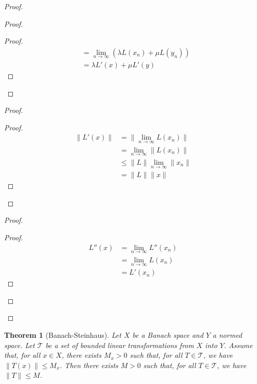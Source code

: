 \documentclass{book}
\let\qed\relax
\newtheorem{thm}[ax]{Theorem}
\theoremstyle{definition}
\begin{document}
\begin{proof}
\begin{proof}
\begin{proof}
\begin{align*}
			& = \lim_{n \rightarrow \infty} (\lambda L(x_n) + \mu L(y_n)) \\
			& = \lambda L'(x) + \mu L'(y)
		\end{align*}
	\end{proof}
\end{proof}
\begin{proof}
	\begin{proof}
		\pf
		\begin{align*}
			\| L'(x) \| & = \| \lim_{n \rightarrow \infty} L(x_n) \| \\
			& = \lim_{n \rightarrow \infty} \| L(x_n) \| \\
			& \leq \|L\| \lim_{n \rightarrow \infty} \| x_n \| \\
			& = \| L \| \| x \|
		\end{align*}
	\end{proof}
\end{proof}
\begin{proof}
	\begin{proof}
		\pf
		\begin{align*}
			L''(x) & = \lim_{n \rightarrow \infty} L''(x_n) \\
			& = \lim_{n \rightarrow \infty} L(x_n) \\
			& = L'(x_n)
		\end{align*}
	\end{proof}
\end{proof}
\qed
\end{proof}

\begin{thm}[Banach-Steinhaus]
Let $X$ be a Banach space and $Y$ a normed space. Let $\mathcal{T}$ be a set of bounded linear transformations from $X$ into $Y$. Assume that, for all $x \in X$, there exists $M_x > 0$ such that, for all $T \in \mathcal{T}$, we have $\| T(x) \| \leq M_x$. Then there exists $M > 0$ such that, for all $T \in \mathcal{T}$, we have $\| T \| \leq M$.
\end{thm}
\end{document}
